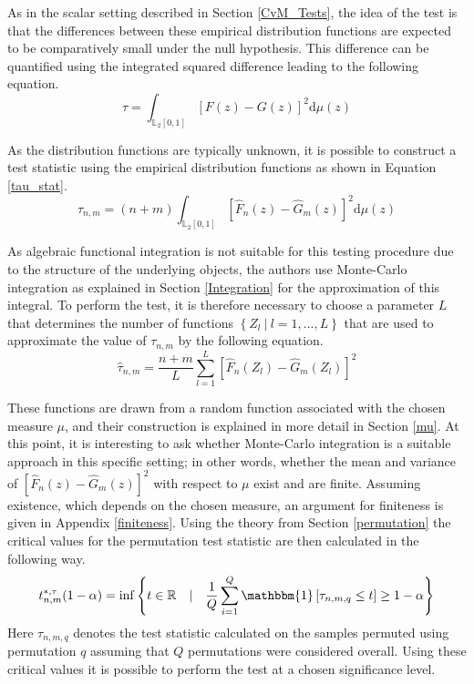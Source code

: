 \documentclass[12pt, a4paper]{article}
\theoremstyle{MAstyle} \newtheorem{assumption}{Assumption}[section]
\theoremstyle{MAstyle} \newtheorem{definition}{Definition}[section]
\theoremstyle{MAstyle} \newtheorem{theorem}{Theorem}[section]
\begin{document}
			As in the scalar setting described in Section \ref{CvM_Tests}, the idea of the test is that the differences between these empirical distribution functions are expected to be comparatively small under the null hypothesis. This difference can be quantified using the integrated squared difference leading to the following equation.
			\begin{equation}
				\tau = \int_{\mathbb{L}_2[0,1]}\left[F(z) - G(z)\right]^2 \mathrm{d} \mu(z)
			\end{equation}
			
			As the distribution functions are typically unknown, it is possible to construct a test statistic using the empirical distribution functions as shown in Equation \ref{tau_stat}.
			\begin{equation}\label{tau_stat}
				\tau_{n,m} = (n+m) \int_{\mathbb{L}_2[0,1]}\left[\hat{F}_n(z) - \hat{G}_m(z)\right]^2 \mathrm{d} \mu(z)
			\end{equation}
		
			As algebraic functional integration is not suitable for this testing procedure due to the structure of the underlying objects, the authors use Monte-Carlo integration as explained in Section \ref{Integration} for the approximation of this integral. To perform the test, it is therefore necessary to choose a parameter $L$ that determines the number of functions $\left\{Z_l \ \vert \ l = 1, \dots, L\right\}$ that are used to approximate the value of $\tau_{n,m}$ by the following equation.
			\begin{equation}\label{tau_hat}
				\hat{\tau}_{n,m} = \frac{n+m}{L} \sum_{l = 1}^{L} \left[\hat{F}_n(Z_l) - \hat{G}_m(Z_l)\right]^2
			\end{equation}
		
			These functions are drawn from a random function associated with the chosen measure $\mu$, and their construction is explained in more detail in Section \ref{mu}. At this point, it is interesting to ask whether Monte-Carlo integration is a suitable approach in this specific setting; in other words, whether the mean and variance of $\left[\hat{F}_n(z) - \hat{G}_m(z)\right]^2$ with respect to $\mu$ exist and are finite.
			Assuming existence, which depends on the chosen measure, an argument for finiteness is given in Appendix \ref{finiteness}.
			Using the theory from Section \ref{permutation} the critical values for the permutation test statistic are then calculated in the following way. 
			\begin{equation}
				t^{*, \tau}_{n,m}(1-\alpha) = \inf \left\{t \in \mathbb{R} \quad \vert \quad \frac{1}{Q} \sum_{i = 1}^{Q} \mathbbm{1}\left[\tau_{n,m,q} \leq t\right] \geq 1 - \alpha \right\}
			\end{equation}
			Here $\tau_{n,m,q}$ denotes the test statistic calculated on the samples permuted using permutation $q$ assuming that $Q$ permutations were considered overall. Using these critical values it is possible to perform the test at a chosen significance level.
		
\end{document}
